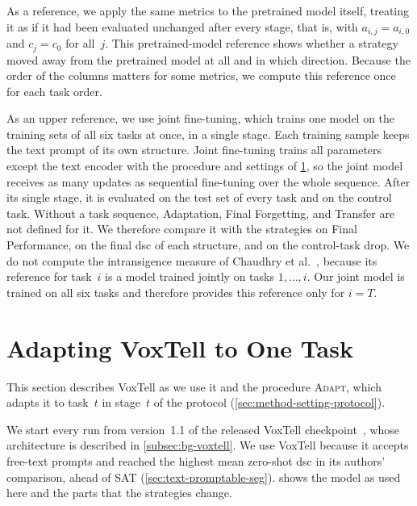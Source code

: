 As a reference, we apply the same metrics to the pretrained model itself, treating it as if it had been evaluated unchanged after every stage, that is, with $a_{i,j} = a_{i,0}$ and $c_j = c_0$ for all~$j$.
This pretrained-model reference shows whether a strategy moved away from the pretrained model at all and in which direction.
Because the order of the columns matters for some metrics, we compute this reference once for each task order.

As an upper reference, we use joint fine-tuning, which trains one model on the training sets of all six tasks at once, in a single stage.
Each training sample keeps the text prompt of its own structure.
Joint fine-tuning trains all parameters except the text encoder with the procedure and settings of \cref{sec:method-adaptation}, so the joint model receives as many updates as sequential fine-tuning over the whole sequence.
After its single stage, it is evaluated on the test set of every task and on the control task.
Without a task sequence, Adaptation, Final Forgetting, and Transfer are not defined for it.
We therefore compare it with the strategies on Final Performance, on the final \gls{dsc} of each structure, and on the control-task drop.
We do not compute the intransigence measure of Chaudhry et al.~\cite{Chaudhry_2018}, because its reference for task~$i$ is a model trained jointly on tasks $1, \dots, i$.
Our joint model is trained on all six tasks and therefore provides this reference only for $i = T$.

\section{Adapting VoxTell to One Task}
\label{sec:method-adaptation}

This section describes VoxTell as we use it and the procedure \textsc{Adapt}, which adapts it to task~$t$ in stage~$t$ of the protocol (\cref{sec:method-setting-protocol}).

We start every run from version~1.1 of the released VoxTell checkpoint~\cite{rokuss2025voxtellfreetextpromptableuniversal}, whose architecture is described in \cref{subsec:bg-voxtell}.
We use VoxTell because it accepts free-text prompts and reached the highest mean zero-shot \gls{dsc} in its authors' comparison, ahead of SAT (\cref{sec:text-promptable-seg}).
 shows the model as used here and the parts that the strategies change.

